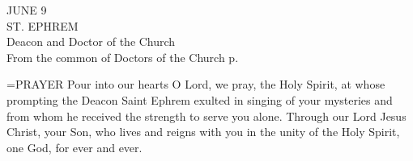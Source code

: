 \begin{center}\normalsize JUNE 9\\
\footnotesize ST. EPHREM\\
\footnotesize Deacon and Doctor of the Church\\
\footnotesize From the common of Doctors of the Church p. \\
\end{center}

\hangindent=\parindent \small{PRAYER 
Pour into our hearts O Lord, we pray, the Holy Spirit,
at whose prompting the Deacon Saint Ephrem
exulted in singing of your mysteries
and from whom he received the strength
to serve you alone.
Through our Lord Jesus Christ, your Son,
who lives and reigns with you in the unity of the Holy Spirit,
one God, for ever and ever.\\}
 
